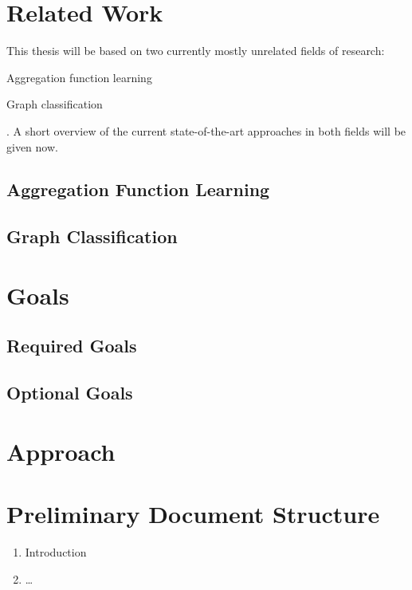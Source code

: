 \documentclass[12pt]{scrartcl}
\begin{document}
\section{Related Work}%
\label{sec:related-work}

This thesis will be based on two currently mostly unrelated fields of research:
\begin{enumerate*}
	\item Aggregation function learning
	\item Graph classification
\end{enumerate*}.
A short overview of the current state-of-the-art approaches in both fields will be given now.

\subsection{Aggregation Function Learning}%
\label{sec:related-work:lta}



\subsection{Graph Classification}%
\label{sec:related-work:gc}

\section{Goals}%
\label{sec:goals}

\subsection{Required Goals}%
\label{sec:goals:req}

\subsection{Optional Goals}%
\label{sec:goals:opt}

\section{Approach}%
\label{sec:approach}

\section{Preliminary Document Structure}%
\label{sec:doc-structure}

\begin{enumerate}
	\item Introduction
	\item \dots
\end{enumerate}
\end{document}
